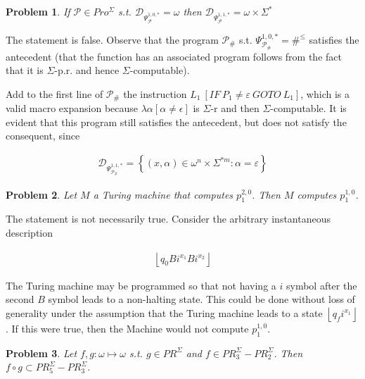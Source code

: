 \documentclass[a4paper, 12pt]{article}
\newtheorem{problem}{Problem}
\newtheorem{problem}{Problem}
\begin{document}
\begin{problem}
    If $\mathcal{P} \in Pro^{\Sigma}$ s.t. $\mathcal{D}_{\Psi_{\mathcal{P}}^{1,
    0, *}} = \omega$ then $\mathcal{D}_{\Psi_{\mathcal{P}}^{1, 1, *}} = \omega
    \times \Sigma^{*}$
\end{problem}

The statement is false. Observe that the program $\mathcal{P}_{\#}$  s.t.
$\Psi_{\mathcal{P}_{\#}}^{1, 0, *} = \#^{\leq}$ satisfies the antecedent (that
the function has an associated program follows from the fact that it is
$\Sigma$-p.r. and hence $\Sigma$-computable).


Add to the first line of $\mathcal{P}_{\#}$ the instruction $L_1 ~ [ IF ~ P_1
\neq \varepsilon ~ GOTO ~ L_1]$, which is a valid macro expansion because
$\lambda \alpha \left[ \alpha \neq \epsilon  \right]$ is $\Sigma$-r and then
$\Sigma$-computable. It is evident that this program still satisfies the
antecedent, but does not satisfy the consequent, since 

\begin{align*}
    \mathcal{D}_{\Psi_{\mathcal{P}_\#}^{1, 1, *}} = \left\{ (x, \alpha) \in
    \omega^{n} \times \Sigma^{*m}  : \alpha = \varepsilon  \right\} 
\end{align*}


\begin{problem}
    Let $M$ a Turing machine that computes $p_1^{2, 0}$. Then $M$ computes
    $p_1^{1, 0}$.
\end{problem}

The statement is not necessarily true. Consider the arbitrary instantaneous
description 

\begin{align*}
    \left\lfloor q_0 B i^{x_1} B i^{x_2} \right\rfloor
\end{align*}

The Turing machine may be programmed so that not having a $i$ symbol after the
second $B$ symbol leads to a non-halting state. This could be done without loss
of generality under the assumption that the Turing machine leads to a state
$\left\lfloor q_f i^{x_1} \right\rfloor$. If this were true, then the Machine
would not compute $p_1^{1, 0}$.

\pagebreak
\begin{problem}
    Let $f, g : \omega \mapsto \omega$ s.t. $g \in PR^{\Sigma}$ and $f \in
    PR_3^{\Sigma} - PR_2^{\Sigma}$. Then $f \circ g \subset PR_5^{\Sigma} -
    PR_3^{\Sigma}$.
\end{problem}
\end{document}
